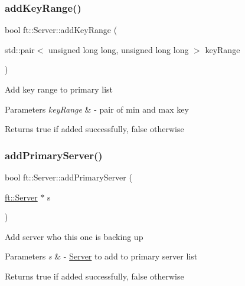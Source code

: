 \subsubsection{\texorpdfstring{add\+Key\+Range()}{addKeyRange()}}
{\footnotesize\ttfamily bool ft\+::\+Server\+::add\+Key\+Range (\begin{DoxyParamCaption}\item[{std\+::pair$<$ unsigned long long, unsigned long long $>$}]{key\+Range }\end{DoxyParamCaption})}

Add key range to primary list


\begin{DoxyParams}{Parameters}
{\em key\+Range} & -\/ pair of min and max key\\
\hline
\end{DoxyParams}
\begin{DoxyReturn}{Returns}
true if added successfully, false otherwise 
\end{DoxyReturn}
\mbox{\label{classft_1_1Server_a395dbe95b7c78b48213a62b4bc2d7c9d}} 
\subsubsection{\texorpdfstring{add\+Primary\+Server()}{addPrimaryServer()}}
{\footnotesize\ttfamily bool ft\+::\+Server\+::add\+Primary\+Server (\begin{DoxyParamCaption}\item[{\mbox{\hyperlink{classft_1_1Server}{ft\+::\+Server}} $\ast$}]{s }\end{DoxyParamCaption})}

Add server who this one is backing up


\begin{DoxyParams}{Parameters}
{\em s} & -\/ \mbox{\hyperlink{classft_1_1Server}{Server}} to add to primary server list\\
\hline
\end{DoxyParams}
\begin{DoxyReturn}{Returns}
true if added successfully, false otherwise 
\end{DoxyReturn}
\mbox{\label{classft_1_1Server_a97e94c9e9c8ed5eb8282564f1d2db739}} 
